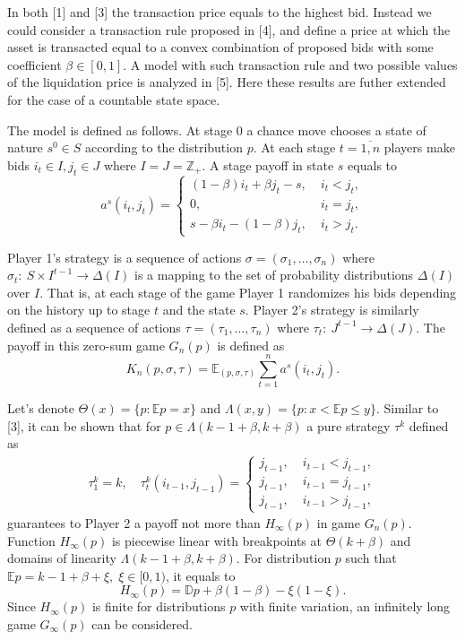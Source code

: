 In both [1] and [3] the transaction price equals to the highest bid. Instead we
could consider a transaction rule proposed in [4], and define a price at which
the asset is transacted equal to a convex combination of proposed bids with some
coefficient $\beta \in [0, 1]$. A model with such transaction rule and two
possible values of the liquidation price is analyzed in [5]. Here these results
are futher extended for the case of a countable state space.

The model is defined as follows. At stage 0 a chance move chooses a state of
nature $s^0 \in S$ according to the distribution $p$. At each stage $t =
\overline{1,n}$ players make bids $i_t \in I, j_t \in J$ where $I = J =
\mathbb{Z}_+$. A stage payoff in state $s$ equals to
\begin{equation*}
  a^s(i_t, j_t) =
  \begin{cases}
    (1-\beta) i_t + \beta j_t - s, &\; i_t < j_t,\\
    0, &\; i_t = j_t,\\
    s - \beta i_t - (1-\beta) j_t, &\; i_t > j_t.
  \end{cases}
\end{equation*}

Player 1's strategy is a sequence of actions $\sigma = (\sigma_1, \ldots,
\sigma_n)$ where $\sigma_t:~S \times I^{t-1} \rightarrow \Delta(I)$ is a mapping
to the set of probability distributions $\Delta(I)$ over $I$. That is, at each
stage of the game Player 1 randomizes his bids depending on the history up to
stage $t$ and the state $s$. Player 2's strategy is similarly defined as a
sequence of actions $\tau = (\tau_1, \ldots, \tau_n)$ where $\tau_t:~J^{t-1}
\rightarrow \Delta(J)$. The payoff in this zero-sum game $G_n(p)$ is defined as
\begin{equation*}
  K_n(p, \sigma, \tau) = \mathbb{E}_{(p, \sigma, \tau)} \sum_{t=1}^n a^s(i_t,j_t).
\end{equation*}

Let's denote $\Theta(x) = \{p: \mathbb{E} p = x\}$ and $\Lambda(x, y) = \{p: x <
\mathbb{E}p \leq y \}$. Similar to [3], it can be shown that for $p \in
\Lambda(k-1+\beta, k+\beta)$ a pure strategy $\tau^k$ defined as
\begin{gather}
  \tau_1^k = k, \quad \tau_t^k(i_{t-1}, j_{t-1}) =
  \begin{cases}
    j_{t-1}, &\; i_{t-1} < j_{t-1},\\
    j_{t-1}, &\; i_{t-1} = j_{t-1},\\
    j_{t-1}, &\; i_{t-1} > j_{t-1},
  \end{cases}
\end{gather}
guarantees to Player 2 a payoff not more than $H_\infty(p)$ in game $G_n(p)$.
Function $H_\infty(p)$ is piecewise linear with breakpoints at $\Theta(k+\beta)$
and domains of linearity $\Lambda(k-1+\beta, k+\beta)$. For distribution $p$
such that $\mathbb{E} p = k - 1 + \beta + \xi, \; \xi \in [0, 1)$, it equals to
\begin{equation}
  H_\infty(p) = \mathbb{D} p + \beta(1-\beta) -\xi(1-\xi).
\end{equation}
Since $H_\infty(p)$ is finite for distributions $p$ with finite variation, an
infinitely long game $G_\infty(p)$ can be considered.

